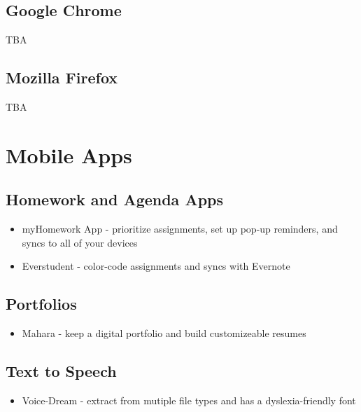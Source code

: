 \documentclass[letterpaper,10pt,english]{sphinxmanual}
\begin{document}
\subsection{Google Chrome}
\label{resources:google-chrome}
TBA


\subsection{Mozilla Firefox}
\label{resources:mozilla-firefox}
TBA


\section{Mobile Apps}
\label{resources:mobile-apps}

\subsection{Homework and Agenda Apps}
\label{resources:homework-and-agenda-apps}\begin{itemize}
\item {} 
myHomework App - prioritize assignments, set up pop-up reminders, and syncs to all of your devices

\item {} 
Everstudent - color-code assignments and syncs with Evernote

\end{itemize}


\subsection{Portfolios}
\label{resources:portfolios}\begin{itemize}
\item {} 
Mahara - keep a digital portfolio and build customizeable resumes

\end{itemize}


\subsection{Text to Speech}
\label{resources:id3}\begin{itemize}
\item {} 
Voice-Dream - extract from mutiple file types and has a dyslexia-friendly font

\end{itemize}
\end{document}
